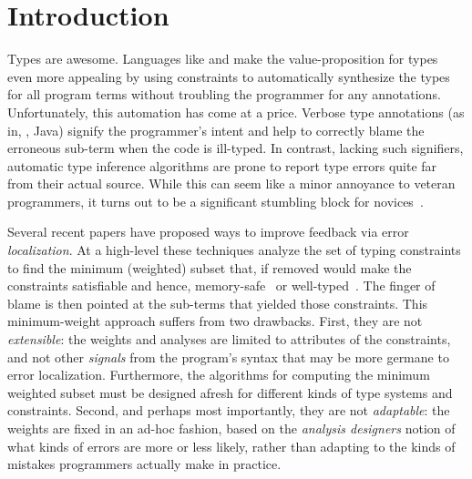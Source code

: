 \section{Introduction}
\label{sec:introduction}

%
Types are awesome.
%
Languages like \ocaml and \haskell make
the value-proposition for types even more
appealing by using constraints to automatically
synthesize the types for all program terms
without troubling the programmer for any
annotations.
%
Unfortunately, this automation has come at a price.
Verbose type annotations (as in, \eg, Java) signify
the programmer's intent and help to correctly
blame the erroneous sub-term when the code is
ill-typed.
%
In contrast, lacking such signifiers, automatic
type inference algorithms are prone to report
type errors quite far from their actual source.
%
While this can seem like a minor annoyance to
veteran programmers, it turns out to be a significant
stumbling block for novices~\citep{Wand1986-nw,Joosten1993-yx}.

%
Several recent papers have proposed ways
to improve feedback via error \emph{localization}.
%
At a high-level these techniques analyze
the set of typing constraints to find
the minimum (weighted) subset that,
if removed would make the constraints
satisfiable and hence, memory-safe~\citep{Jose:2011}
or well-typed~\citep{Zhang2014-lv,Loncaric2016-uk,Chen2014-vm,Pavlinovic2014-mr}.
The finger of blame is then pointed at the
sub-terms that yielded those constraints.
%
This minimum-weight approach suffers
from two drawbacks.
%
First, they are not \emph{extensible}:
the weights and analyses are limited
to attributes of the constraints, and
not other \emph{signals} from the
program's syntax that may be more
germane to error localization. Furthermore,
the algorithms for computing
the minimum weighted subset must be
designed afresh for different kinds
of type systems and constraints.
%
Second, and perhaps most importantly,
they are not \emph{adaptable}: the
weights are fixed in an ad-hoc fashion, based on the
\emph{analysis designers} notion
of what kinds of errors are more
or less likely, rather than
adapting to the kinds of mistakes
programmers actually make in practice.

